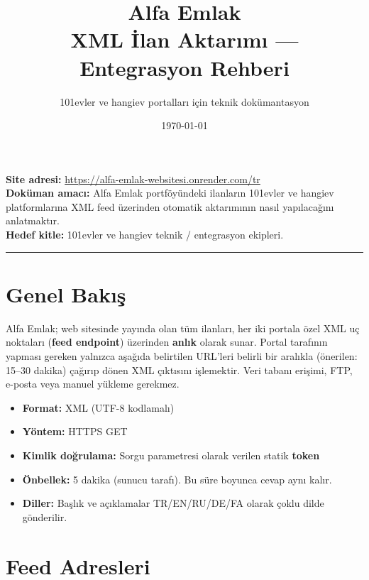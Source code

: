\documentclass[11pt,a4paper]{article}
\title{\vspace{-1cm}\Huge\color{brand}\textbf{Alfa Emlak}\\[4pt]\Large\color{black}\normalfont XML İlan Aktarımı — Entegrasyon Rehberi}
\author{\normalfont\large 101evler ve hangiev portalları için teknik dokümantasyon}
\date{\today}
\begin{document}
\maketitle
\thispagestyle{empty}

\vspace{-0.5cm}

\begin{infobox}
\textbf{Site adresi:} \url{https://alfa-emlak-websitesi.onrender.com/tr} \\
\textbf{Doküman amacı:} Alfa Emlak portföyündeki ilanların 101evler ve hangiev platformlarına XML feed üzerinden otomatik aktarımının nasıl yapılacağını anlatmaktır. \\
\textbf{Hedef kitle:} 101evler ve hangiev teknik / entegrasyon ekipleri.
\end{infobox}

\tableofcontents
\vspace{0.5cm}
\hrule
\vspace{0.5cm}

\section{Genel Bakış}

Alfa Emlak; web sitesinde yayında olan tüm ilanları, her iki portala özel XML uç noktaları (\textbf{feed endpoint}) üzerinden \textbf{anlık} olarak sunar. Portal tarafının yapması gereken yalnızca aşağıda belirtilen URL'leri belirli bir aralıkla (önerilen: 15--30 dakika) çağırıp dönen XML çıktısını işlemektir. Veri tabanı erişimi, FTP, e-posta veya manuel yükleme gerekmez.

\begin{itemize}[leftmargin=*]
\item \textbf{Format:} XML (UTF-8 kodlamalı)
\item \textbf{Yöntem:} HTTPS GET
\item \textbf{Kimlik doğrulama:} Sorgu parametresi olarak verilen statik \textbf{token}
\item \textbf{Önbellek:} 5 dakika (sunucu tarafı). Bu süre boyunca cevap aynı kalır.
\item \textbf{Diller:} Başlık ve açıklamalar TR/EN/RU/DE/FA olarak çoklu dilde gönderilir.
\end{itemize}

\section{Feed Adresleri}
\end{document}
